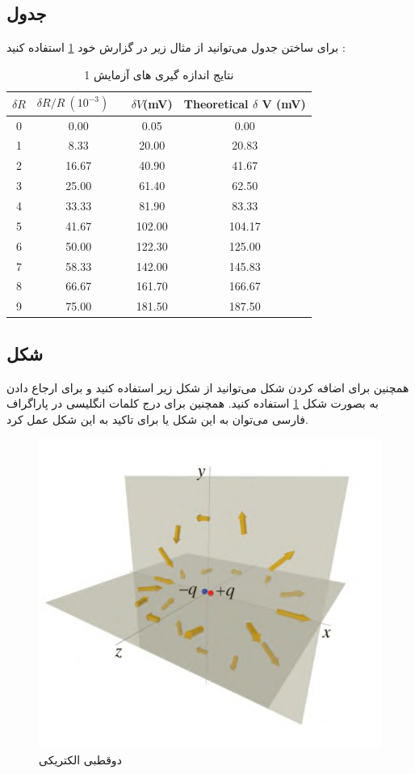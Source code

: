 \subsection{جدول}
\par
برای ساختن جدول 
 می‌توانید از مثال زیر در گزارش خود
  \ref{t1}
   استفاده کنید :


\begin{table}[!h]
\centering
\begin{latin}
\begin{tabular}{|c|c|c|c|}
	\hline
	$\delta R $ & $\delta R/R \ (10^{-3})$ \  & $ \delta V $(mV) & Theoretical $\delta$ V (mV) \\
	\hline\hline
	0 & 0.00 & 0.05 & 0.00\\
	\hline
	1 & 8.33 & 20.00 &20.83\\
	\hline
	2 & 16.67 & 40.90 &41.67\\
	\hline
	3 & 25.00 & 61.40 &62.50\\
	\hline
	4 & 33.33 & 81.90 &83.33\\
	\hline
	5 & 41.67 & 102.00 &104.17\\
	\hline
	6 & 50.00 & 122.30 &125.00\\
	\hline
	7 & 58.33 & 142.00 &145.83\\
	\hline
	8 & 66.67 & 161.70 &166.67\\
	\hline
	9 & 75.00 & 181.50 &187.50\\
	\hline
\end{tabular}
\end{latin}
\caption{نتایج اندازه گیری های آزمایش 1}
\label{t1}
\end{table}

\subsection{شکل}
\par
همچنین برای اضافه کردن شکل می‌توانید از شکل زیر استفاده کنید و برای ارجاع دادن به بصورت شکل
 \ref{fig:dynamicprogramming}
 استفاده کنید.
 همچنین برای درج کلمات انگلیسی در پاراگراف فارسی می‌توان به این شکل
 یا برای تاکید به این شکل
 عمل کرد.
\begin{figure}[h!]
    \centering
    \includegraphics[width=0.5\linewidth]{images/dipole.jpg}
    \caption{دوقطبی الکتریکی}
    \label{fig:dynamicprogramming}
\end{figure}\\




